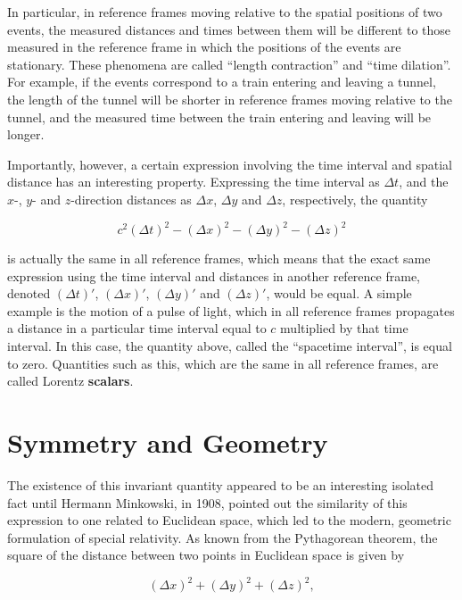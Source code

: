 \documentclass[12pt]{article}
\begin{document}
In particular, in reference frames moving relative to the spatial positions of two events, the measured distances and times between them will be different to those measured in the reference frame in which the positions of the events are stationary. These phenomena are called ``length contraction'' and ``time dilation''. For example, if the events correspond to a train entering and leaving a tunnel, the length of the tunnel will be shorter in reference frames moving relative to the tunnel, and the measured time between the train entering and leaving will be longer.


Importantly, however, a certain expression involving the time interval and spatial distance has an interesting property. Expressing the time interval as $\Delta t$, and the $x$-, $y$- and $z$-direction distances as $\Delta x$, $\Delta y$ and $\Delta z$, respectively, the quantity

\begin{equation}
    c^2 {\left(\Delta t\right)}^2 - {\left(\Delta x\right)}^2 - {\left(\Delta y\right)}^2 - {\left(\Delta z\right)}^2
\end{equation}

is actually the same in all reference frames, which means that the exact same expression using the time interval and distances in another reference frame, denoted ${\left(\Delta t\right)}'$, ${\left(\Delta x\right)}'$, ${\left(\Delta y\right)}'$ and ${\left(\Delta z\right)}'$, would be equal. A simple example is the motion of a pulse of light, which in all reference frames propagates a distance in a particular time interval equal to $c$ multiplied by that time interval. In this case, the quantity above, called the ``spacetime interval'', is equal to zero. Quantities such as this, which are the same in all reference frames, are called Lorentz \textbf{scalars}.

\section{Symmetry and Geometry}

The existence of this invariant quantity appeared to be an interesting isolated fact until Hermann Minkowski, in 1908, pointed out the similarity of this expression to one related to Euclidean space, which led to the modern, geometric formulation of special relativity. As known from the Pythagorean theorem, the square of the distance between two points in Euclidean space is given by

\begin{equation}
    {\left(\Delta x\right)}^2 + {\left(\Delta y\right)}^2 + {\left(\Delta z\right)}^2,
\end{equation}
\end{document}
